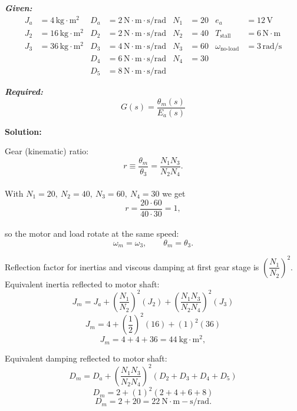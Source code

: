 ﻿\documentclass[11pt]{article}
\begin{document}
\vspace{12pt}

\noindent\textbf{\textit{Given:}}
\[
\begin{aligned}
J_a &= 4\, \text{kg}\cdot\text{m}^2 & D_a &= 2\, \text{N}\cdot\text{m}\cdot\text{s/rad} & N_1 &= 20 & e_a &= 12\,\text{V} \\
J_2 &= 16\, \text{kg}\cdot\text{m}^2 & D_2 &= 2\, \text{N}\cdot\text{m}\cdot\text{s/rad} & N_2 &= 40 & T_{\text{stall}} &= 6\,\text{N}\cdot\text{m} \\
J_3 &= 36\, \text{kg}\cdot\text{m}^2 & D_3 &= 4\, \text{N}\cdot\text{m}\cdot\text{s/rad} & N_3 &= 60 & \omega_{\text{no-load}} &= 3\,\text{rad/s} \\
& & D_4 &= 6\, \text{N}\cdot\text{m}\cdot\text{s/rad} & N_4 &= 30 & & \\
& & D_5 &= 8\, \text{N}\cdot\text{m}\cdot\text{s/rad} & & & &
\end{aligned}
\]

\vspace{12pt}

\noindent \textbf{\textit{Required:}}
\[
G(s) = \frac{\theta_m(s)}{E_a(s)}
\]

\vspace{12pt}

\noindent \textbf{Solution:}

Gear (kinematic) ratio:
\[
r \equiv \frac{\theta_m}{\theta_3}=\frac{N_1 N_3}{N_2 N_4}.
\]  \\

With \(N_1=20,\ N_2=40,\ N_3=60,\ N_4=30\) we get
\[
r=\frac{20 \cdot 60}{40 \cdot 30}=1,
\] \\

so the motor and load rotate at the same speed:
\[
\omega_m = \omega_3,\qquad \theta_m = \theta_3.
\]

Reflection factor for inertias and viscous damping at first gear stage is \(\left(\dfrac{N_1}{N_2}\right)^2\). \\

Equivalent inertia reflected to motor shaft:
\[
J_m = J_a + \left(\frac{N_1}{N_2}\right)^2 (J_2) + \left(\frac{N_1 N_3}{N_2 N_4}\right)^2 (J_3)
\]
\[
J_m = 4 + \left(\frac{1}{2}\right)^2 (16) + (1)^2 (36)
\]
\[
J_m = 4 + 4 + 36 = 44\ \mathrm{kg\cdot m^2},
\]

Equivalent damping reflected to motor shaft:
\[
D_m = D_a + \left(\frac{N_1 N_3}{N_2 N_4}\right)^2 (D_2 + D_3 + D_4 + D_5)
\]
\[
D_m = 2 + (1)^2 (2 + 4 + 6 + 8)
\]
\[
D_m = 2 + 20 = 22\ \mathrm{N\cdot m\!-\!s/rad}.
\]
\end{document}
